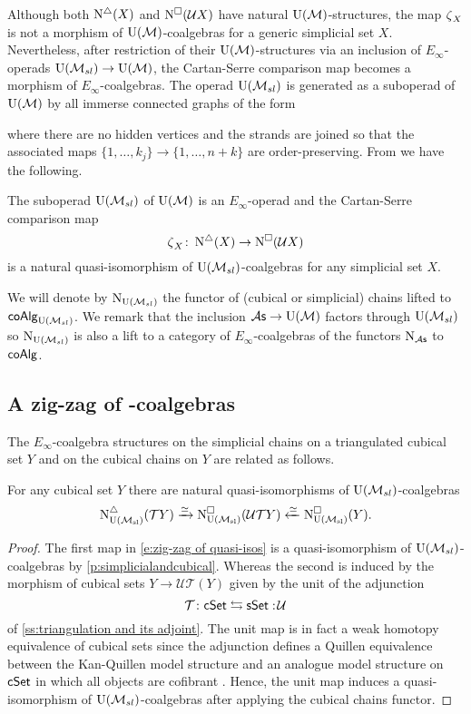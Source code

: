 Although both $\operatorname{N^{\triangle}}(X)$ and $\operatorname{N^{\square}}(\mathcal{U} X)$ have natural ${\operatorname{U}(\mathcal{M})}$-structures, the map $\operatorname{\zeta}_X$ is not a morphism of ${\operatorname{U}(\mathcal{M})}$-coalgebras for a generic simplicial set $X$.
Nevertheless, after restriction of their ${\operatorname{U}(\mathcal{M})}$-structures via an inclusion of $E_\infty$-operads ${\operatorname{U}(\mathcal{M}_{sl})} \to {\operatorname{U}(\mathcal{M})}$, the Cartan-Serre comparison map becomes a morphism of $E_\infty$-coalgebras.
The operad ${\operatorname{U}(\mathcal{M}_{sl})}$ is generated as a suboperad of ${\operatorname{U}(\mathcal{M})}$ by all immerse connected graphs of the form

where there are no hidden vertices and the strands are joined so that the associated maps $\{1, \dots, k_j\} \to \{1, \dots, n+k\}$ are order-preserving.
From \cite{medina2021cubical} we have the following.

\begin{proposition} \label{p:simplicialandcubical}
	The suboperad ${\operatorname{U}(\mathcal{M}_{sl})}$ of ${\operatorname{U}(\mathcal{M})}$ is an $E_\infty$-operad and the Cartan-Serre comparison map
	\[
	\operatorname{\zeta}_X \colon \operatorname{N^{\triangle}}(X) \to \operatorname{N^{\square}}(\mathcal U X)
	\]
	is a natural quasi-isomorphism of ${\operatorname{U}(\mathcal{M}_{sl})}$-coalgebras for any simplicial set $X$.
\end{proposition}

We will denote by $\operatorname{N}_{\operatorname{U}(\mathcal{M}_{sl})}$ the functor of (cubical or simplicial) chains lifted to $\mathsf{coAlg}_{\operatorname{U}(\mathcal{M}_{sl})}$.
We remark that the inclusion ${\mathcal{A}\mathsf{s}} \to {\operatorname{U}(\mathcal{M})}$ factors through ${\operatorname{U}(\mathcal{M}_{sl})}$ so $\operatorname{N}_{\operatorname{U}(\mathcal{M}_{sl})}$ is also a lift to a category of $E_\infty$-coalgebras of the functors $\operatorname{N}_{\mathcal{A}\mathsf{s}}$ to $\mathsf{coAlg}$.

\subsection{A zig-zag of \pdfEinfty-coalgebras}
The $E_{\infty}$-coalgebra structures on the simplicial chains on a triangulated cubical set $Y$ and on the cubical chains on $Y$ are related as follows.

\begin{lemma} \label{l:zigzag}
	For any cubical set $Y$ there are natural quasi-isomorphisms of ${\operatorname{U}(\mathcal{M}_{sl})}$-coalgebras
	\begin{equation} \label{e:zig-zag of quasi-isos}
	\operatorname{N^{\triangle}_{{\operatorname{U}(\mathcal{M}_{sl})}}}(\mathcal{T}Y) \xrightarrow{\simeq}
	\operatorname{N^{\square}_{{\operatorname{U}(\mathcal{M}_{sl})}}}(\mathcal{U}\mathcal{T}Y) \xleftarrow{\simeq}
	\operatorname{N^{\square}_{{\operatorname{U}(\mathcal{M}_{sl})}}}(Y).
	\end{equation}
\end{lemma}

\begin{proof}
	The first map in \eqref{e:zig-zag of quasi-isos} is a quasi-isomorphism of ${\operatorname{U}(\mathcal{M}_{sl})}$-coalgebras by \cref{p:simplicialandcubical}.
	Whereas the second is induced by the morphism of cubical sets $Y \to \mathcal{U} \mathcal{T} (Y)$ given by the unit of the adjunction
	\[
	\mathcal{T} \colon \mathsf{cSet} \leftrightarrows \mathsf{sSet} :\! \mathcal{U}
	\]
	of \cref{ss:triangulation and its adjoint}.
	The unit map is in fact a weak homotopy equivalence of cubical sets since the adjunction defines a Quillen equivalence between the Kan-Quillen model structure and an analogue model structure on $\mathsf{cSet}$ in which all objects are cofibrant \cite{cisinski2006presheaves}.
	Hence, the unit map induces a quasi-isomorphism of ${\operatorname{U}(\mathcal{M}_{sl})}$-coalgebras after applying the cubical chains functor.
\end{proof}

